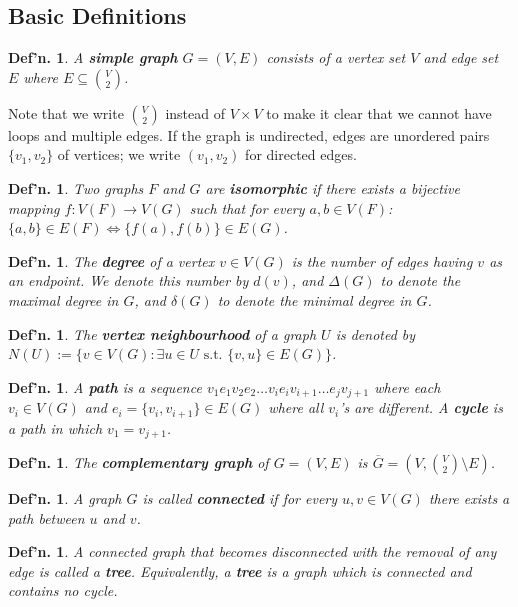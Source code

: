 \documentclass[12pt, a4paper]{book}
\newtheorem{definition}[theorem]{Def'n.}
\theoremstyle{nonumberplain}
\begin{document}
\subsection{Basic Definitions}
\begin{definition}
    A \textbf{simple graph} $G=(V,E)$ consists of a vertex set $V$ and edge set $E$ where $E\subseteq\binom{V}{2}$.
\end{definition}
Note that we write $\binom{V}{2}$ instead of $V\times V$ to make it clear that we cannot have loops and multiple edges.
If the graph is undirected, edges are unordered pairs $\{v_1,v_2\}$ of vertices; we write $(v_1,v_2)$ for directed edges.
\begin{definition}
    Two graphs $F$ and $G$ are \textbf{isomorphic} if there exists a bijective mapping $f:V(F)\to V(G)$ such that for every $a,b\in V(F)$: $\{a,b\}\in E(F)\Leftrightarrow \{f(a),f(b)\}\in E(G)$.
\end{definition}
\begin{definition}
    The \textbf{degree} of a vertex $v\in V(G)$ is the number of edges having $v$ as an endpoint.
    We denote this number by $d(v)$, and $\Delta(G)$ to denote the maximal degree in $G$, and $\delta(G)$ to denote the minimal degree in $G$.
\end{definition}
\begin{definition}
    The \textbf{vertex neighbourhood} of a graph $U$ is denoted by $N(U):=\{v\in V(G):\exists u\in U\text{ s.t. }\{v,u\}\in E(G)\}$.
\end{definition}
\begin{definition}
    A \textbf{path} is a sequence $v_1e_1v_2e_2\ldots v_ie_iv_{i+1}\ldots e_jv_{j+1}$ where each $v_i\in V(G)$ and $e_i=\{v_i,v_{i+1}\}\in E(G)$ where all $v_i$'s are different.
    A \textbf{cycle} is a path in which $v_1=v_{j+1}$.
\end{definition}
\begin{definition}
    The \textbf{complementary graph} of $G=(V,E)$ is $\overline{G}=\left(V,\binom{V}{2}\setminus E\right)$.
\end{definition}
\begin{definition}
    A graph $G$ is called \textbf{connected} if for every $u,v\in V(G)$ there exists a path between $u$ and $v$.
\end{definition}
\begin{definition}
    A connected graph that becomes disconnected with the removal of any edge is called a \textbf{tree}.
    Equivalently, a \textbf{tree} is a graph which is connected and contains no cycle.
\end{definition}
\end{document}

